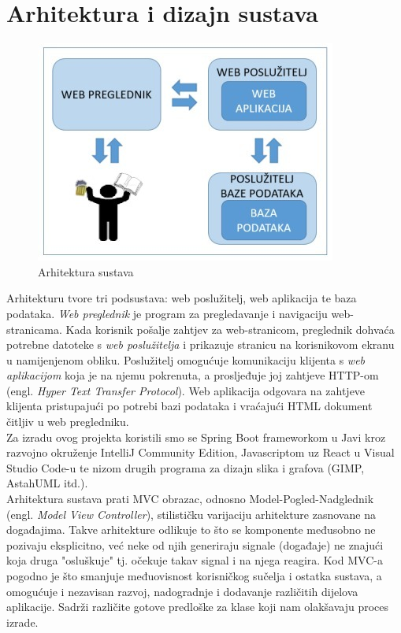 \chapter{Arhitektura i dizajn sustava}
		
	\vspace{-1cm}
	\begin{figure}[h]
		\begin{center}
			\includegraphics{slike/arhitektura_skica.png}
			\caption{Arhitektura sustava}
		\end{center}	
	\end{figure}
	
	\indent Arhitekturu tvore tri podsustava: web poslužitelj, web aplikacija te baza podataka. \textit{Web preglednik} je program za pregledavanje i navigaciju web-stranicama. Kada korisnik pošalje zahtjev za web-stranicom, preglednik dohvaća potrebne datoteke s \textit{web poslužitelja} i prikazuje stranicu na korisnikovom ekranu u namijenjenom obliku. Poslužitelj omogućuje komunikaciju klijenta s \textit{web aplikacijom} koja je na njemu pokrenuta, a prosljeđuje joj zahtjeve HTTP-om (engl. \textit{Hyper Text Transfer Protocol}). Web aplikacija odgovara na zahtjeve klijenta pristupajući po potrebi bazi podataka i vraćajući HTML dokument čitljiv u web pregledniku. \\
	
	\indent Za izradu ovog projekta koristili smo se Spring Boot frameworkom u Javi kroz razvojno okruženje IntelliJ Community Edition, Javascriptom uz React u Visual Studio Code-u te nizom drugih programa za dizajn slika i grafova (GIMP, AstahUML itd.). \\
	
	\indent Arhitektura sustava prati MVC obrazac, odnosno Model-Pogled-Nadglednik (engl. \textit{Model View Controller}), stilističku varijaciju arhitekture zasnovane na događajima. Takve arhitekture odlikuje to što se komponente međusobno ne pozivaju eksplicitno, već neke od njih generiraju signale (događaje) ne znajući koja druga "osluškuje" tj. očekuje takav signal i na njega reagira. Kod MVC-a pogodno je što smanjuje međuovisnost korisničkog sučelja i ostatka sustava, a omogućuje i nezavisan razvoj, nadogradnje i dodavanje različitih dijelova aplikacije. Sadrži različite gotove predloške za klase koji nam olakšavaju proces izrade.\\
	
